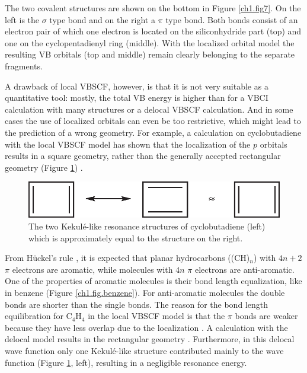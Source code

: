 The two covalent structures are shown on the bottom in Figure \ref{ch1.fig7}. On the left is the $\sigma$ type bond and on the right a $\pi$ type bond. Both bonds consist of an electron pair of which one electron is located on the siliconhydride part (top) and one on the cyclopentadienyl ring (middle). With the localized orbital model the resulting VB orbitals (top and middle) remain clearly belonging to the separate fragments. 

A drawback of local VBSCF, however, is that it is not very suitable as a quantitative tool: mostly, the total VB energy is higher than for a VBCI calculation with many structures or a delocal VBSCF calculation. And in some cases the use of localized orbitals can even be too restrictive, which might lead to the prediction of a wrong geometry. For example, a calculation on cyclobutadiene with the local VBSCF model \cite{cyclobutt} has shown that the localization of the $p$ orbitals results in a square geometry, rather than the generally accepted rectangular geometry (Figure \ref{ch1.fig.butadiene}) \cite{arnold}. 
\begin{figure}[htp]
\center
\includegraphics{introduction/figures/butadiene.eps}
\caption{The two Kekul\'e-like resonance structures of cyclobutadiene (left) which is approximately equal to the structure on the right.}
\label{ch1.fig.butadiene}
\end{figure}
From H\"{u}ckel's rule \cite{huckel2,huckel4}, it is expected that planar hydrocarbons ((CH)$_n$) with $4n+2$ $\pi$ electrons are aromatic, while molecules with $4n$ $\pi$ electrons are anti-aromatic. One of the properties of aromatic molecules is their bond length equalization, like in benzene (Figure \ref{ch1.fig.benzene}). For anti-aromatic molecules the double bonds are shorter than the single bonds. The reason for the bond length equilibration for C$_4$H$_4$ in the local VBSCF model is that the $\pi$ bonds are weaker because they have less overlap due to the localization \cite{cyclobutt}. A calculation with the delocal model results in the rectangular geometry \cite{cyclobutt}. Furthermore, in this delocal wave function only one Kekul\'{e}-like structure contributed mainly to the wave function (Figure \ref{ch1.fig.butadiene}, left), resulting in a negligible resonance energy.

